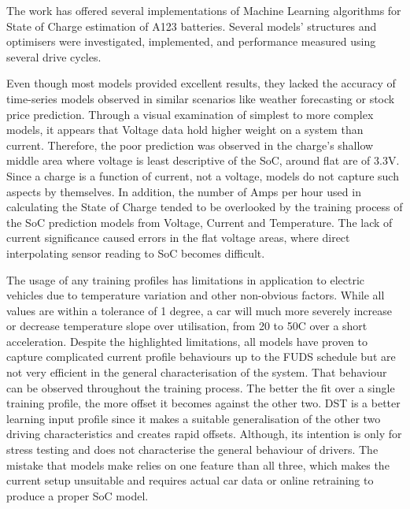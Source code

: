 The work has offered several implementations of Machine Learning algorithms for State of Charge estimation of A123 batteries.
Several models' structures and optimisers were investigated, implemented, and performance measured using several drive cycles.

%
%
Even though most models provided excellent results, they lacked the accuracy of time-series models observed in similar scenarios like weather forecasting or stock price prediction.
Through a visual examination of simplest to more complex models, it appears that Voltage data hold higher weight on a system than current.
Therefore, the poor prediction was observed in the charge's shallow middle area where voltage is least descriptive of the SoC, around flat are of 3.3V.
Since a charge is a function of current, not a voltage, models do not capture such aspects by themselves.
In addition, the number of Amps per hour used in calculating the State of Charge tended to be overlooked by the training process of the SoC prediction models from Voltage, Current and Temperature.
The lack of current significance caused errors in the flat voltage areas, where direct interpolating sensor reading to SoC becomes difficult. 

%
%
The usage of any training profiles has limitations in application to electric vehicles due to temperature variation and other non-obvious factors.
While all values are within a tolerance of 1 degree, a car will much more severely increase or decrease temperature slope over utilisation, from 20 to 50\textdegree{}C over a short acceleration.
Despite the highlighted limitations, all models have proven to capture complicated current profile behaviours up to the FUDS schedule but are not very efficient in the general characterisation of the system.
That behaviour can be observed throughout the training process.
The better the fit over a single training profile, the more offset it becomes against the other two.
DST is a better learning input profile since it makes a suitable generalisation of the other two driving characteristics and creates rapid offsets.
Although, its intention is only for stress testing and does not characterise the general behaviour of drivers.
The mistake that models make relies on one feature than all three, which makes the current setup unsuitable and requires actual car data or online retraining to produce a proper SoC model.

